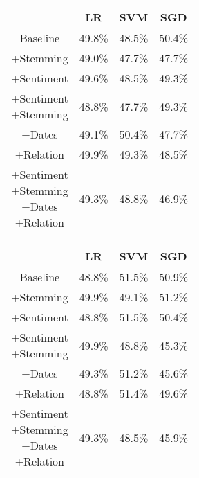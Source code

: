 \documentclass[11pt,a4paper]{article}
\begin{document}
\begin{center}
\begin{tabular}{ |c|c|c|c| }
 \hline
  & LR & SVM & SGD \\
  \hline
  Baseline & 49.8\% & 48.5\% & 50.4\% \\
  \hline
 +Stemming & 49.0\% & 47.7\% & 47.7\% \\
  \hline
 +Sentiment & 49.6\% & 48.5\% & 49.3\% \\
  \hline
  \shortstack{+Sentiment \\ +Stemming} & 48.8\% & 47.7\% & 49.3\%\\
 \hline
 +Dates & 49.1\% & 50.4\% & 47.7\% \\
  \hline
 +Relation & 49.9\% & 49.3\% & 48.5\% \\
  \hline
  \shortstack{+Sentiment \\ +Stemming \\+Dates \\+Relation} & 49.3\% & 48.8\% & 46.9\% \\
 \hline
\end{tabular}
\end{center}

\begin{center}
\begin{tabular}{ |c|c|c|c| }
 \hline
  & LR & SVM & SGD \\
  \hline
  Baseline & 48.8\% & 51.5\% & 50.9\% \\
  \hline
 +Stemming & 49.9\% & 49.1\% & 51.2\% \\
  \hline
 +Sentiment & 48.8\% & 51.5\% & 50.4\% \\
  \hline
  \shortstack{+Sentiment \\ +Stemming} & 49.9\% & 48.8\% & 45.3\%\\
 \hline
 +Dates & 49.3\% & 51.2\% & 45.6\% \\
  \hline
 +Relation & 48.8\% & 51.4\% & 49.6\% \\
  \hline
  \shortstack{+Sentiment \\ +Stemming \\+Dates \\+Relation} & 49.3\% & 48.5\% & 45.9\% \\
 \hline
\end{tabular}
\end{center}

\newpage
\end{document}

